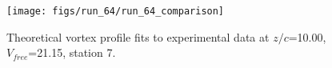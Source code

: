 \begin{figure}[H]
\centering
\texttt{[image: figs/run\_64/run\_64\_comparison]}
\caption{Theoretical vortex profile fits to experimental data at $z/c$=10.00, $V_{free}$=21.15, station 7.}
\label{fig:run_64_comparison}
\end{figure}


